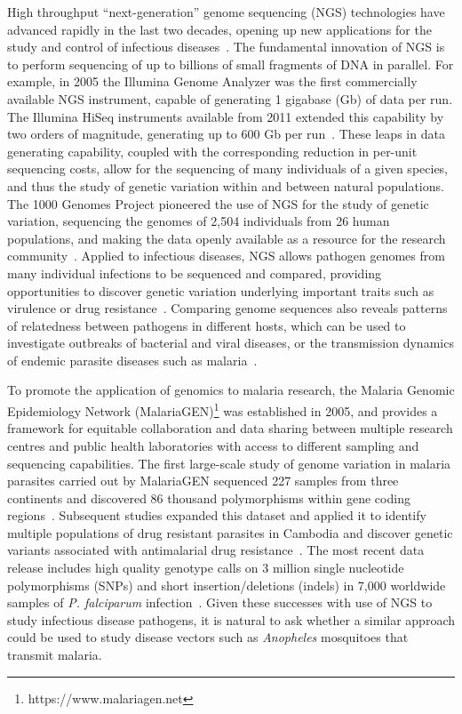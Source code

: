 \begin{refsection}
High throughput ``next-generation'' genome sequencing (NGS) technologies have advanced rapidly in the last two decades, opening up new applications for the study and control of infectious diseases~\parencite{Goodwin2016}.
%
The fundamental innovation of NGS is to perform sequencing of up to billions of small fragments of DNA in parallel.
%
For example, in 2005 the Illumina Genome Analyzer was the first commercially available NGS instrument, capable of generating 1 gigabase (Gb) of data per run.
%
The Illumina HiSeq instruments available from 2011 extended this capability by two orders of magnitude, generating up to 600 Gb per run~\parencite{Illumina2017}.
%
These leaps in data generating capability, coupled with the corresponding reduction in per-unit sequencing costs, allow for the sequencing of many individuals of a given species, and thus the study of genetic variation within and between natural populations.
%
The 1000 Genomes Project pioneered the use of NGS for the study of genetic variation, sequencing the genomes of 2,504 individuals from 26 human populations, and making the data openly available as a resource for the research community~\parencite{1000G2015}.
%
Applied to infectious diseases, NGS allows pathogen genomes from many individual infections to be sequenced and compared, providing opportunities to discover genetic variation underlying important traits such as virulence or drug resistance~\parencite{Armstrong2019}.
%
Comparing genome sequences also reveals patterns of relatedness between pathogens in different hosts, which can be used to investigate outbreaks of bacterial and viral diseases, or the transmission dynamics of endemic parasite diseases such as malaria~\parencite{Robinson2013,Daniels2015,Wohl2016,Neafsey2017,Wesolowski2018,Armstrong2019}.

To promote the application of genomics to malaria research, the Malaria Genomic Epidemiology Network (MalariaGEN)\footnote{https://www.malariagen.net} was established in 2005, and provides a framework for equitable collaboration and data sharing between multiple research centres and public health laboratories with access to different sampling and sequencing capabilities. 
%
The first large-scale study of genome variation in malaria parasites carried out by MalariaGEN sequenced 227 samples from three continents and discovered 86 thousand polymorphisms within gene coding regions~\parencite{Manske2012}.
%
Subsequent studies expanded this dataset and applied it to identify multiple populations of drug resistant parasites in Cambodia and discover genetic variants associated with antimalarial drug resistance~\parencite{Miotto2013,Miotto2015}.
%
The most recent data release includes high quality genotype calls on 3 million single nucleotide polymorphisms (SNPs) and short insertion/deletions (indels) in 7,000 worldwide samples of \textit{P. falciparum} infection~\parencite{MalariaGEN2019PF}.
%
Given these successes with use of NGS to study infectious disease pathogens, it is natural to ask whether a similar approach could be used to study disease vectors such as \textit{Anopheles} mosquitoes that transmit malaria.
%



\end{refsection}
